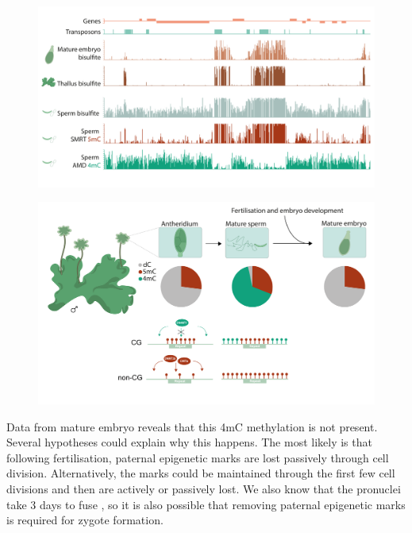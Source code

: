 \begin{figure}[htbp!] 
\centering    
    \includegraphics[width=1\textwidth]{Chapter3/Figs/Intro/Marchantia_germline_seq.pdf}
\caption{}
\label{fig:Mp_germline-seq}
\captionsetup{font=small}
    \caption*{}
\end{figure}

\begin{figure}[htbp!] 
\centering    
    \includegraphics[width=1\textwidth]{Chapter3/Figs/Intro/Graphical_abstract.pdf}
\caption{}
\label{fig:Mp_graphical_abstract}
\captionsetup{font=small}
    \caption*{}
\end{figure}


Data from mature embryo reveals that this 4mC methylation is not present. Several hypotheses could explain why this happens. The most likely is that following fertilisation, paternal epigenetic marks are lost passively through cell division. Alternatively, the marks could be maintained through the first few cell divisions and then are actively or passively lost. We also know that the pronuclei take 3 days to fuse \citep{RN139}, so it is also possible that removing paternal epigenetic marks is required for zygote formation. 

